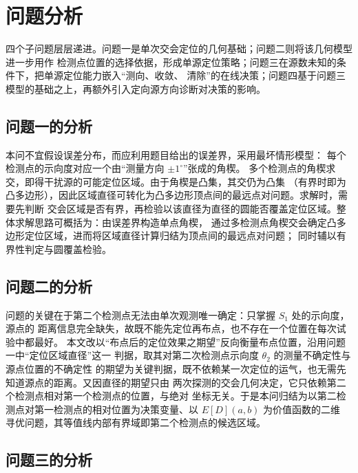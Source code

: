 \section{问题分析}

四个子问题层层递进。问题一是单次交会定位的几何基础；问题二则将该几何模型进一步用作
检测点位置的选择依据，形成单源定位策略；问题三在源数未知的条件下，把单源定位能力嵌入“测向、收敛、
清除”的在线决策；问题四基于问题三模型的基础之上，再额外引入定向源方向诊断对决策的影响。

\subsection{问题一的分析}
本问不宜假设误差分布，而应利用题目给出的误差界，采用最坏情形模型：
每个检测点的示向度对应一个由“测量方向 \(\pm 1^\circ\)”张成的角楔。
多个检测点的角楔求交，即得干扰源的可能定位区域。由于角楔是凸集，其交仍为凸集
（有界时即为凸多边形），因此区域直径可转化为凸多边形顶点间的最远点对问题。求解时，需要先判断
交会区域是否有界，再检验以该直径为直径的圆能否覆盖定位区域。整体求解思路可概括为：由误差界构造单点角楔，
通过多检测点角楔交会确定凸多边形定位区域，进而将区域直径计算归结为顶点间的最远点对问题；
同时辅以有界性判定与圆覆盖检验。

\subsection{问题二的分析}
问题的关键在于第二个检测点无法由单次观测唯一确定：只掌握 $S_1$ 处的示向度，源点的
距离信息完全缺失，故既不能先定位再布点，也不存在一个位置在每次试验中都最好。
本文改以“布点后的定位效果之期望”反向衡量布点位置，沿用问题一中“定位区域直径”这一
判据，取其对第二次检测点示向度 $\theta_2$ 的测量不确定性与源点位置的不确定性
的期望为关键判据，既不依赖某一次定位的运气，也无需先知道源点的距离。又因直径的期望只由
两次探测的交会几何决定，它只依赖第二个检测点相对第一个检测点的位置，与绝对
坐标无关。于是本问归结为以第二检测点对第一检测点的相对位置为决策变量、以 $E[D](a,b)$ 为价值函数的二维
寻优问题，其等值线内部有界域即第二个检测点的候选区域。

\subsection{问题三的分析}

